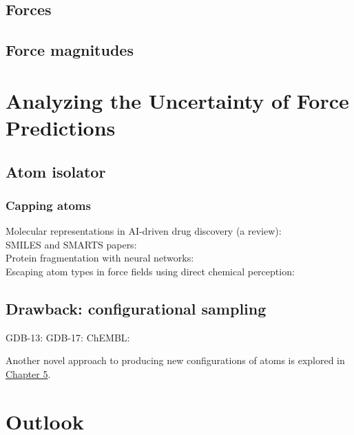 \subsection{Forces}

\subsection{Force magnitudes}

\section{Analyzing the Uncertainty of Force Predictions}

\subsection{Atom isolator}
\subsubsection{Capping atoms}

Molecular representations in AI-driven drug discovery (a review): \cite{mol_reps_in_AI_drug_discovery_david}\\
SMILES and SMARTS papers: \cite{SMILES_pair_encoding_li, mol_patterns_SMARTS_schmidt, automated_fragment_gen_smiles_bilsland}\\
Protein fragmentation with neural networks: \cite{protein_ff_fragmentation_nn_wang}\\
Escaping atom types in force fields using direct chemical perception: \cite{direct_chem_perception_mobley} \\

\subsection{Drawback: configurational sampling}

GDB-13: \cite{gdb-13}
GDB-17: \cite{gdb-17}
ChEMBL: \cite{ChEMBL_gaulton}

Another novel approach to producing new configurations of atoms is explored in \hyperlink{configurational_sampling}{Chapter 5}.

\section{Outlook}